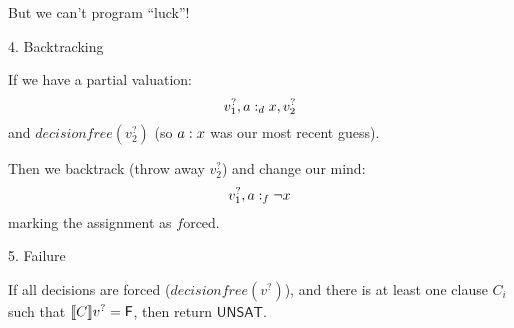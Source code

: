 \documentclass[xetex,aspectratio=169,14pt,hyperref={pdfpagelabels=true,pdflang={en-GB}}]{beamer}
\begin{document}
\begin{frame}
  But we can't program ``luck''!
\end{frame}

\begin{frame}
  {4. Backtracking}

  If we have a partial valuation:
  \begin{displaymath}
    v_1^?, a :_d x, v_2^?
  \end{displaymath}
  and $\mathit{decisionfree}(v_2^?)$ (so $a : x$ was our most recent guess).

  \medskip

  Then we backtrack (throw away $v_2^?$) and change our mind:
  \begin{displaymath}
    v_1^?, a :_f \lnot x
  \end{displaymath}
  marking the assignment as $f$orced.

\end{frame}

\begin{frame}
  {5. Failure}

  If all decisions are forced ($\mathit{decisionfree}(v^?)$), and
  there is at least one clause $C_i$ such that $\llbracket C \rrbracket v^? = \mathsf{F}$,
  then return $\mathsf{UNSAT}$.

\end{frame}
\end{document}
